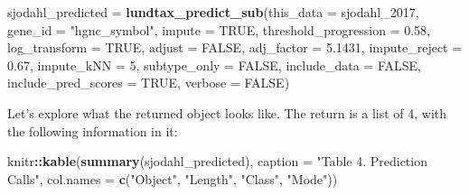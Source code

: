 \documentclass[
]{article}
\newenvironment{Shaded}{\begin{snugshade}}{\end{snugshade}}
\newcommand{\AttributeTok}[1]{\textcolor[rgb]{0.13,0.29,0.53}{#1}}
\newcommand{\ConstantTok}[1]{\textcolor[rgb]{0.56,0.35,0.01}{#1}}
\newcommand{\DecValTok}[1]{\textcolor[rgb]{0.00,0.00,0.81}{#1}}
\newcommand{\FloatTok}[1]{\textcolor[rgb]{0.00,0.00,0.81}{#1}}
\newcommand{\FunctionTok}[1]{\textcolor[rgb]{0.13,0.29,0.53}{\textbf{#1}}}
\newcommand{\NormalTok}[1]{#1}
\newcommand{\OtherTok}[1]{\textcolor[rgb]{0.56,0.35,0.01}{#1}}
\newcommand{\SpecialCharTok}[1]{\textcolor[rgb]{0.81,0.36,0.00}{\textbf{#1}}}
\newcommand{\StringTok}[1]{\textcolor[rgb]{0.31,0.60,0.02}{#1}}
\begin{document}
\begin{Shaded}
\begin{Highlighting}[]
\NormalTok{sjodahl\_predicted }\OtherTok{=} \FunctionTok{lundtax\_predict\_sub}\NormalTok{(}\AttributeTok{this\_data =}\NormalTok{ sjodahl\_2017, }
                                        \AttributeTok{gene\_id =} \StringTok{"hgnc\_symbol"}\NormalTok{,}
                                        \AttributeTok{impute =} \ConstantTok{TRUE}\NormalTok{,}
                                        \AttributeTok{threshold\_progression =} \FloatTok{0.58}\NormalTok{,}
                                        \AttributeTok{log\_transform =} \ConstantTok{TRUE}\NormalTok{, }
                                        \AttributeTok{adjust =} \ConstantTok{FALSE}\NormalTok{, }
                                        \AttributeTok{adj\_factor =} \FloatTok{5.1431}\NormalTok{, }
                                        \AttributeTok{impute\_reject =} \FloatTok{0.67}\NormalTok{, }
                                        \AttributeTok{impute\_kNN =} \DecValTok{5}\NormalTok{, }
                                        \AttributeTok{subtype\_only =} \ConstantTok{FALSE}\NormalTok{, }
                                        \AttributeTok{include\_data =} \ConstantTok{FALSE}\NormalTok{, }
                                        \AttributeTok{include\_pred\_scores =} \ConstantTok{TRUE}\NormalTok{, }
                                        \AttributeTok{verbose =} \ConstantTok{FALSE}\NormalTok{)}
\end{Highlighting}
\end{Shaded}

Let's explore what the returned object looks like. The return is a list
of 4, with the following information in it:

\begin{Shaded}
\begin{Highlighting}[]
\NormalTok{knitr}\SpecialCharTok{::}\FunctionTok{kable}\NormalTok{(}\FunctionTok{summary}\NormalTok{(sjodahl\_predicted), }
             \AttributeTok{caption =} \StringTok{"Table 4. Prediction Calls"}\NormalTok{, }
             \AttributeTok{col.names =} \FunctionTok{c}\NormalTok{(}\StringTok{"Object"}\NormalTok{, }\StringTok{"Length"}\NormalTok{, }\StringTok{"Class"}\NormalTok{, }\StringTok{"Mode"}\NormalTok{))}
\end{Highlighting}
\end{Shaded}
\end{document}
